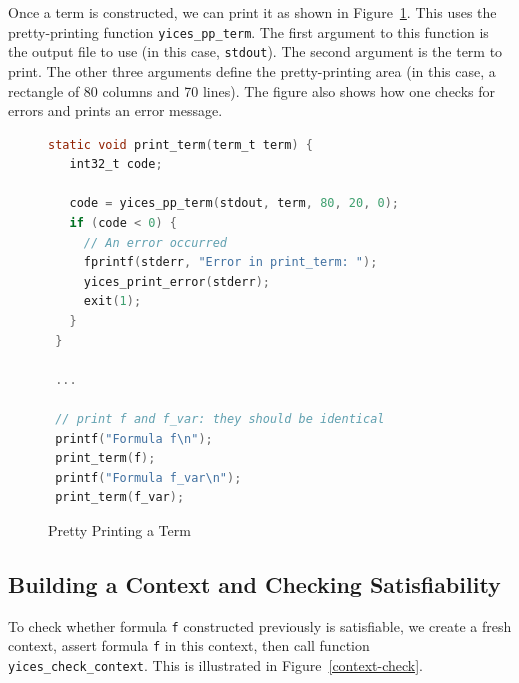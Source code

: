 \documentclass[11pt,twoside,fleqn,openright,titlepage]{cslreport}
\begin{document}
Once a term is constructed, we can print it as shown in
Figure~\ref{pretty-printing}.  This uses the pretty-printing function
\texttt{yices\_pp\_term}. The first argument to this function is the
output file to use (in this case, \texttt{stdout}). The second
argument is the term to print. The other three arguments define the
pretty-printing area (in this case, a rectangle of 80 columns and 70
lines). The figure also shows how one checks for errors and prints
an error message.

\begin{figure}
\begin{footnotesize}
\begin{lstlisting}[language=C,morekeywords={int32_t},keywordstyle=\color{blue},stringstyle=\color{red},commentstyle=\color{olive}]
 static void print_term(term_t term) {
   int32_t code;

   code = yices_pp_term(stdout, term, 80, 20, 0);
   if (code < 0) {
     // An error occurred
     fprintf(stderr, "Error in print_term: ");
     yices_print_error(stderr);
     exit(1);
   }
 }

 ...

 // print f and f_var: they should be identical
 printf("Formula f\n");
 print_term(f);
 printf("Formula f_var\n");
 print_term(f_var);
\end{lstlisting}
\end{footnotesize}
\caption{Pretty Printing a Term}
\label{pretty-printing}
\end{figure}

\subsection*{Building a Context and Checking Satisfiability}

To check whether formula \texttt{f} constructed previously is
satisfiable, we create a fresh context, assert formula \texttt{f}
in this context, then call function
\texttt{yices\_check\_context}. This is illustrated in
Figure~\ref{context-check}.
\end{document}
